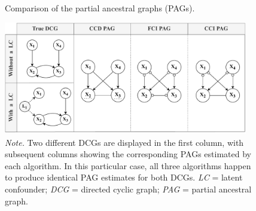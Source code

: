 \documentclass[twoside, 11pt]{article}
\newcommand*{\figref}[2][]{%
  \hyperref[{fig:#2}]{%
    Figure~\ref*{fig:#2}%
    \ifx\\#1\\%
    \else
      #1%
    \fi
  }%
}
\begin{document}

 
\vspace{5mm}

\begin{figure}[!hb]
    \centering
        \caption{Comparison of the partial ancestral graphs (PAGs).}
        \includegraphics[width=0.95\textwidth]{figures/Fig10.pdf}
        \vspace{1mm}
        \caption*{\small{\textit{Note.} Two different DCGs are displayed in the first column, with subsequent columns showing the corresponding PAGs estimated by each algorithm. In this particular case, all three algorithms happen to produce identical PAG estimates for both DCGs.
        \textit{LC} = latent confounder; \textit{DCG} = directed cyclic graph; \textit{PAG} = partial ancestral graph.}}
    \label{fig:10}
\end{figure}
\end{document}
